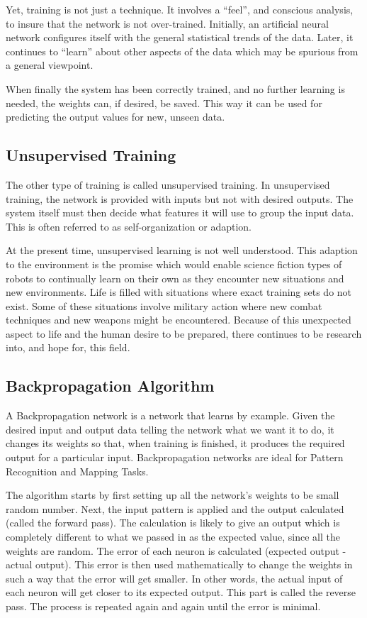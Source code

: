 Yet, training is not just a technique. It involves a ``feel'', and conscious analysis, to insure that the network is not over-trained. Initially, an artificial neural network configures itself with the general statistical trends of the data. Later, it continues to ``learn'' about other aspects of the data which may be spurious from a general viewpoint.

When finally the system has been correctly trained, and no further learning is needed, the weights can, if desired, be saved. This way it can be used for predicting the output values for new, unseen data.

\vspace{10pt}
\subsection*{Unsupervised Training}

The other type of training is called unsupervised training. In unsupervised training, the network is provided with inputs but not with desired outputs. The system itself must then decide what features it will use to group the input data. This is often referred to as self-organization or adaption.

At the present time, unsupervised learning is not well understood. This adaption to the environment is the promise which would enable science fiction types of robots to continually learn on their own as they encounter new situations and new environments. Life is filled with situations where exact training sets do not exist. Some of these situations involve military action where new combat techniques and new weapons might be encountered. Because of this unexpected aspect to life and the human desire to be prepared, there continues to be research into, and hope for, this field.
\vspace{10pt}

\subsection{Backpropagation Algorithm}

A Backpropagation network is a network that learns by example. Given the desired input and output data telling the network what we want it to do, it changes its weights so that, when training is finished, it produces the required output for a particular input. 
Backpropagation networks are ideal for Pattern Recognition and Mapping Tasks.

The algorithm starts by first setting up all the network's weights to be small random number. Next, the input pattern is applied and the output calculated (called the forward pass). The calculation is likely to give an output which is completely different to what we passed in as the expected value, since all the weights are random. The error of each neuron is calculated (expected output - actual output). This error is then used mathematically to change the weights in such a way that the error will get smaller. In other words, the actual input of each neuron will get closer to its expected output. This  part is called the reverse pass. The process is repeated again and again until the error is minimal.

